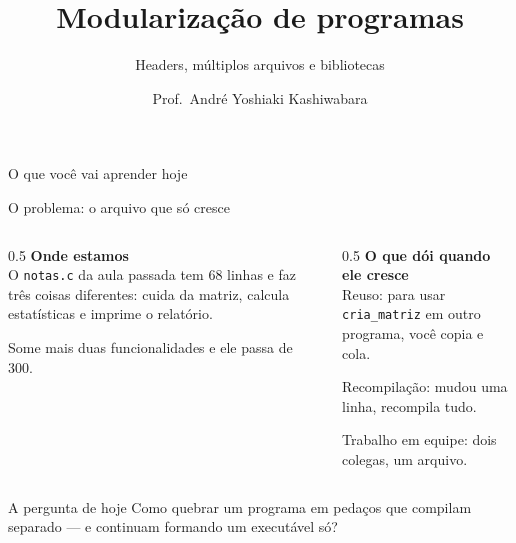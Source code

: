 \documentclass[aspectratio=169]{beamer}
\title{Modularização de programas}
\subtitle{Headers, múltiplos arquivos e bibliotecas}
\author{Prof.\ André Yoshiaki Kashiwabara}
\institute{DCOMP -- Universidade Federal de Sergipe\\
\texttt{andreyoshiaki@dcomp.ufs.br}}
\date{}
\begin{document}
\begin{frame}[plain]
  \titlepage
\end{frame}

\begin{frame}{O que você vai aprender hoje}
  \begin{center}
  \end{center}
\end{frame}

\begin{frame}{O problema: o arquivo que só cresce}
  \begin{columns}[T]
    \begin{column}{0.5\textwidth}
      \textbf{Onde estamos}\\[0.3em]
      O \texttt{notas.c} da aula passada tem 68 linhas e faz três coisas
      diferentes: cuida da matriz, calcula estatísticas e imprime o relatório.

      \medskip
      Some mais duas funcionalidades e ele passa de 300.
    \end{column}
    \begin{column}{0.5\textwidth}
      \textbf{O que dói quando ele cresce}\\[0.3em]
      \textcolor{UFSRed}{Reuso:} para usar \texttt{cria\_matriz} em outro
      programa, você copia e cola.

      \medskip
      \textcolor{UFSRed}{Recompilação:} mudou uma linha, recompila tudo.

      \medskip
      \textcolor{UFSRed}{Trabalho em equipe:} dois colegas, um arquivo.
    \end{column}
  \end{columns}
  \begin{block}{A pergunta de hoje}
    Como quebrar um programa em pedaços que compilam separado --- e continuam
    formando um executável só?
  \end{block}
\end{frame}
\end{document}

